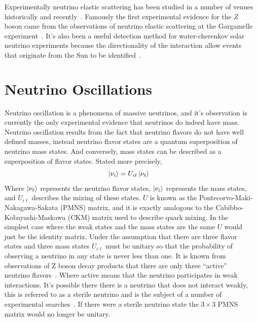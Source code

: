 Experimentally neutrino elastic scattering has been studied in a number
of venues historically and recently~\citep{reines2, es_measurement, nutev}.
Famously the first experimental evidence for the $Z$ boson came from
the observations of neutrino elastic scattering at the
Gargamelle experiment~\citep{gargamelle}.
It's also been a useful detection method for water-cherenkov solar
neutrino experiments because the directionality of the interaction
allow events that originate from the Sun to be identified~\citep{sno_first,
kamiokande, superk_first_solar}.

\section{Neutrino Oscillations}
\label{sec:neut_osc}
Neutrino oscillation is a phenomena of massive neutrinos, and it's observation
is currently the only experimental evidence that neutrinos do indeed have mass.
Neutrino oscillation results from the fact that neutrino flavors do not have
well defined masses, instead neutrino flavor states are a quantum superposition
of neutrino mass states.
And conversely, mass states can be described as a superposition of flavor states.
Stated more precisely,
\begin{equation}
    \ket{\nu_{i}} = U_{i\ell}\ket{\nu_\ell}
\end{equation}
Where $\ket{\nu_\ell}$ represents the neutrino flavor states, $\ket{\nu_i}$
represents the mass states, and $U_{i\ell}$ describes the mixing of these
states.
$U$ is known as the Pontecorvo-Maki-Nakagawa-Sakata (PMNS) matrix,
and it is exactly analogous to the Cabibbo-Kobayashi-Maskawa (CKM) matrix used
to describe quark mixing.
In the simplest case where the weak states and the mass states are the same
$U$ would just be the identity matrix.
Under the assumption that there are three flavor states and three mass states
$U_{i\ell}$ must be unitary so that the probability of observing
a neutrino in any state is never less than one.
It is known from observations of Z boson decay products that
there are only three ``active'' neutrino flavors~\citep{Zdecay}.
Where active means that the neutrino participates in
weak interactions.
It's possible there there is a neutrino that does not interact
weakly, this is referred to as a sterile neutrino and is the
subject of a number of experimental searches~\citep{prospect, lsnd, miniboone, jsns2}.
If there were a sterile neutrino state the $3\times3$ PMNS matrix would
no longer be unitary.

